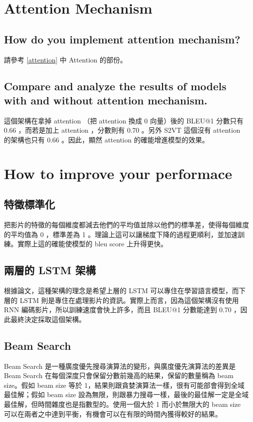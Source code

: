 \documentclass[fleqn,a4paper,12pt]{article}
\begin{document}
\section{Attention Mechanism}


\subsection{How do you implement attention mechanism?}

請參考 \ref{attention} 中 Attention 的部份。

\subsection{Compare and analyze the results of models with and without attention mechanism. }

這個架構在拿掉 attention （把 attention 換成 0 向量）後的 BLEU@1 分數只有 0.66 ，而若是加上 attention ，分數則有 0.70 。另外 S2VT \cite{DBLP:conf/iccv/VenugopalanRDMD15} 這個沒有 attention 的架構也只有 0.66 。因此，顯然 attention 的確能增進模型的效果。

\section{How to improve your performace}

\subsection{特徵標準化}

把影片的特徵的每個維度都減去他們的平均值並除以他們的標準差，使得每個維度的平均值為 0 ，標準差為 1 。理論上這可以讓梯度下降的過程更順利，並加速訓練。實際上這的確能使模型的 bleu score 上升得更快。

\subsection{兩層的 LSTM 架構}

根據論文，這種架構的理念是希望上層的 LSTM 可以專住在學習語言模型，而下層的 LSTM 則是專住在處理影片的資訊。實際上而言，因為這個架構沒有使用 RNN 編碼影片，所以訓練速度會快上許多，而且 BLEU@1 分數能達到 0.70 ，因此最終決定採取這個架構。

\subsection{Beam Search}

Beam Search 是一種廣度優先搜尋演算法的變形，與廣度優先演算法的差異是 Beam Search 在每個深度只會保留分數前幾高的結果，保留的數量稱為 beam size。假如 beam size 等於 1，結果則跟貪婪演算法一樣，很有可能部會得到全域最佳解；假如 beam size 設為無限，則跟暴力搜尋一樣，最後的最佳解一定是全域最佳解，但時間雜度也是指數型的。使用一個大於 1 而小於無限大的 beam size 可以在兩者之中達到平衡，有機會可以在有限的時間內獲得較好的結果。
\end{document}
